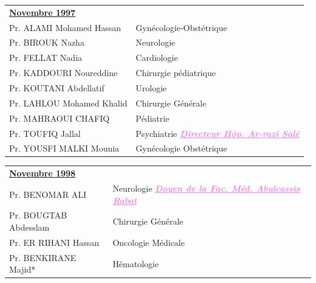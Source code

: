 \begin{table}[H]

  \begin{tabular}{l l}
   \multicolumn{2}{l}{\textbf{\underline{Novembre 1997}}}\vspace*{0.5em}\\
   Pr. ALAMI Mohamed Hassan & \hspace*{2em} Gynécologie-Obstétrique \\
   Pr. BIROUK Nazha & \hspace*{2em} Neurologie  \\
   Pr. FELLAT Nadia & \hspace*{2em} Cardiologie \\
   Pr. KADDOURI Noureddine	& \hspace*{2em} Chirurgie pédiatrique\\
   Pr. KOUTANI Abdellatif &	\hspace*{2em} Urologie\\
   Pr. LAHLOU Mohamed Khalid & \hspace*{2em} Chirurgie Générale \\
   Pr. MAHRAOUI CHAFIQ & \hspace*{2em} Pédiatrie\\
   Pr. TOUFIQ Jallal & \hspace*{2em} Psychiatrie \textcolor{violet}{\textbf{\emph{\underline{Directeur Hôp. Ar-razi Salé}}}}\\
   Pr. YOUSFI MALKI Mounia & \hspace*{2em} Gynécologie Obstétrique\\
  \end{tabular}
  
  \end{table}

  \begin{table}[H]

    \begin{tabular}{l l}
     \multicolumn{2}{l}{\textbf{\underline{Novembre 1998}}}\vspace*{0.5em}\\
     Pr. BENOMAR ALI & \hspace*{4em} Neurologie \textcolor{violet}{\textbf{\emph{\underline{Doyen de la Fac. Méd. Abulcassis Rabat}}}}\\
     Pr. BOUGTAB Abdesslam & \hspace*{4em} Chirurgie Générale  \\
     Pr. ER RIHANI Hassan & \hspace*{4em} Oncologie Médicale \\
     Pr. BENKIRANE Majid*	& \hspace*{4em} Hématologie\\
     
    \end{tabular}
    
    \end{table}

